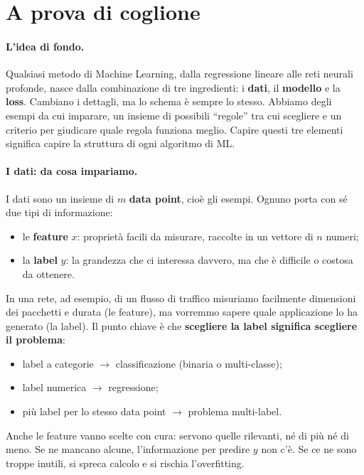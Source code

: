 \section{A prova di coglione}

\paragraph*{L'idea di fondo.}
Qualsiasi metodo di Machine Learning, dalla regressione lineare alle reti neurali profonde, nasce dalla combinazione di tre ingredienti: i \textbf{dati}, il \textbf{modello} e la \textbf{loss}. Cambiano i dettagli, ma lo schema è sempre lo stesso. Abbiamo degli esempi da cui imparare, un insieme di possibili ``regole'' tra cui scegliere e un criterio per giudicare quale regola funziona meglio. Capire questi tre elementi significa capire la struttura di ogni algoritmo di ML.

\paragraph*{I dati: da cosa impariamo.}
I dati sono un insieme di $m$ \textbf{data point}, cioè gli esempi. Ognuno porta con sé due tipi di informazione:
\begin{itemize}
    \item le \textbf{feature} $x$: proprietà facili da misurare, raccolte in un vettore di $n$ numeri;
    \item la \textbf{label} $y$: la grandezza che ci interessa davvero, ma che è difficile o costosa da ottenere.
\end{itemize}
In una rete, ad esempio, di un flusso di traffico misuriamo facilmente dimensioni dei pacchetti e durata (le feature), ma vorremmo sapere quale applicazione lo ha generato (la label). Il punto chiave è che \textbf{scegliere la label significa scegliere il problema}:
\begin{itemize}
    \item label a categorie $\rightarrow$ classificazione (binaria o multi-classe);
    \item label numerica $\rightarrow$ regressione;
    \item più label per lo stesso data point $\rightarrow$ problema multi-label.
\end{itemize}
Anche le feature vanno scelte con cura: servono quelle rilevanti, né di più né di meno. Se ne mancano alcune, l'informazione per predire $y$ non c'è. Se ce ne sono troppe inutili, si spreca calcolo e si rischia l'overfitting.

